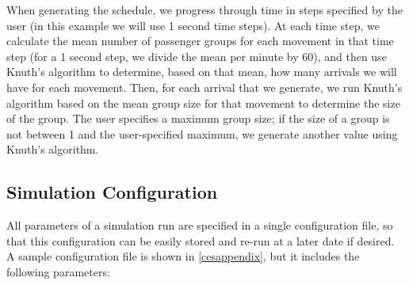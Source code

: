 \documentclass{UoYCSproject}
\begin{document}
When generating the schedule, we progress through time in steps specified by the user (in this example we will use 1 second time steps).  At each time step, we calculate the mean number of passenger groups for each movement in that time step (for a 1 second step, we divide the mean per minute by 60), and then use Knuth's algorithm to determine, based on that mean, how many arrivals we will have for each movement.  Then, for each arrival that we generate, we run Knuth's algorithm based on the mean group size for that movement to determine the size of the group.  The user specifies a maximum group size; if the size of a group is not between 1 and the user-specified maximum, we generate another value using Knuth's algorithm.

\subsection{Simulation Configuration}
All parameters of a simulation run are specified in a single configuration file, so that this configuration can be easily stored and re-run at a later date if desired.  A sample configuration file is shown in \autoref{cesappendix}, but it includes the following parameters:
\end{document}
